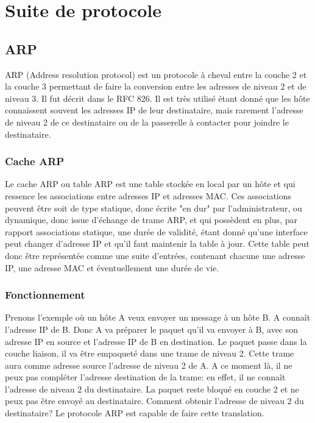 \section{Suite de protocole}

\subsection{ARP} ARP (Address resolution protocol) est un protocole à cheval
entre la couche 2 et la couche 3 permettant de faire la conversion entre les
adresses de niveau 2 et de niveau 3. Il fut décrit dans le RFC 826\cite{url-RFC-ARP}.
Il est très utilisé étant donné que les hôte connaissent souvent les adresses
IP de leur destinataire, mais rarement l'adresse de niveau 2 de ce destinataire
ou de la passerelle à contacter pour joindre le destinataire.

\subsubsection{Cache ARP} Le cache ARP ou table ARP est une table stockée en
local par un hôte et qui ressence les associations entre adresses IP et adresses
MAC.  Ces associations peuvent être soit de type statique, donc écrite "en dur"
par l'administrateur, ou dynamique, donc issue d'échange de trame ARP, et qui
possèdent en plus, par rapport associations statique, une durée de validité, étant
donné qu'une interface peut changer d'adresse IP et qu'il faut maintenir la
table à jour.  Cette table peut donc être représentée comme une suite d'entrées,
contenant chacune une adresse IP, une adresse MAC et éventuellement une durée
de vie.

\subsubsection{Fonctionnement} Prenons l'exemple où un hôte A veux envoyer un message à
un hôte B. A connaît l'adresse IP de B. Donc A va préparer le paquet qu'il va envoyer
à B, avec son adresse IP en source et l'adresse IP de B en destination. Le
paquet passe dans la couche liaison, il va être empaqueté dans une trame de
niveau 2. Cette trame aura comme adresse source l'adresse de niveau 2 de A.
A ce moment là, il ne peux pas compléter l'adresse destination de la trame: en
effet, il ne connaît l'adresse de niveau 2 du destinataire. La paquet reste
bloqué en couche 2 et ne peux pas être envoyé au destinataire. Comment obtenir
l'adresse de niveau 2 du destinataire?  Le protocole ARP est capable de faire
cette translation.

